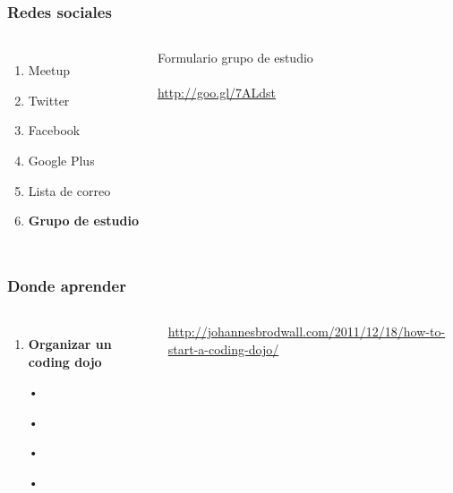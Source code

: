 \documentclass{beamer}
\begin{document}
\begin{frame}
\frametitle{Redes sociales}
\begin{columns}[c] %

\begin{enumerate}
\item Meetup
\item Twitter
\item Facebook
\item Google Plus
\item Lista de correo
\item \textbf{Grupo de estudio}
\end{enumerate}

{\color{blue}Formulario grupo de estudio}
\\~\\
{\color{blue}\url{http://goo.gl/7ALdst}}
\end{columns}
\end{frame}
\begin{frame}
\frametitle{Donde aprender}
\begin{columns}[c] %
\begin{enumerate}
\item \textbf{Organizar un coding dojo}
\item[•]
\item[•]
\item[•]
\item[•]
\end{enumerate}

{\color{blue}\url{http://johannesbrodwall.com/2011/12/18/how-to-start-a-coding-dojo/}}
\end{columns}
\end{frame}
\end{document}
